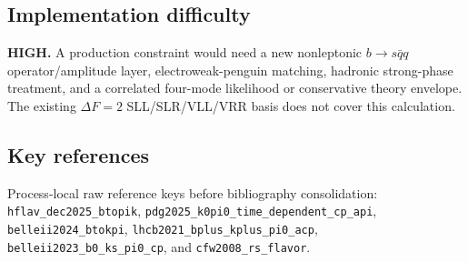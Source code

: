 \subsection*{Implementation difficulty}
\textbf{HIGH.}  A production constraint would need a new nonleptonic
\(b\to s\bar q q\) operator/amplitude layer, electroweak-penguin matching,
hadronic strong-phase treatment, and a correlated four-mode likelihood or
conservative theory envelope.  The existing \(\Delta F=2\) SLL/SLR/VLL/VRR
basis does not cover this calculation.

\subsection*{Key references}
Process-local raw reference keys before bibliography consolidation:
\texttt{hflav\_dec2025\_btopik},
\texttt{pdg2025\_k0pi0\_time\_dependent\_cp\_api},
\texttt{belleii2024\_btokpi},
\texttt{lhcb2021\_bplus\_kplus\_pi0\_acp},
\texttt{belleii2023\_b0\_ks\_pi0\_cp}, and
\texttt{cfw2008\_rs\_flavor}.
